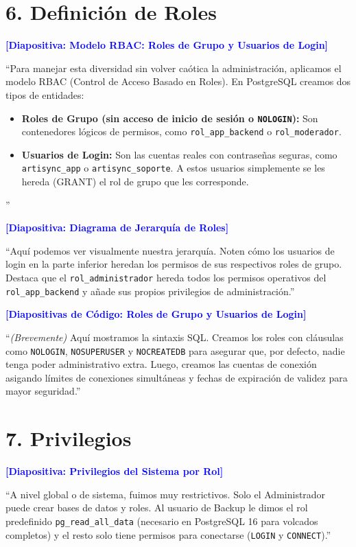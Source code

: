 \documentclass[12pt, a4paper]{article}
\begin{document}
\section*{6. Definición de Roles}
\textbf{\textcolor{blue}{[Diapositiva: Modelo RBAC: Roles de Grupo y Usuarios de Login]}}

``Para manejar esta diversidad sin volver caótica la administración, aplicamos el modelo RBAC (Control de Acceso Basado en Roles).
En PostgreSQL creamos dos tipos de entidades:
\begin{itemize}
    \item \textbf{Roles de Grupo (sin acceso de inicio de sesión o \texttt{NOLOGIN}):} Son contenedores lógicos de permisos, como \texttt{rol\_app\_backend} o \texttt{rol\_moderador}.
    \item \textbf{Usuarios de Login:} Son las cuentas reales con contraseñas seguras, como \texttt{artisync\_app} o \texttt{artisync\_soporte}. A estos usuarios simplemente se les hereda (GRANT) el rol de grupo que les corresponde.
\end{itemize}''

\vspace{0.5cm}
\textbf{\textcolor{blue}{[Diapositiva: Diagrama de Jerarquía de Roles]}}

``Aquí podemos ver visualmente nuestra jerarquía. Noten cómo los usuarios de login en la parte inferior heredan los permisos de sus respectivos roles de grupo. Destaca que el \texttt{rol\_administrador} hereda todos los permisos operativos del \texttt{rol\_app\_backend} y añade sus propios privilegios de administración.''

\vspace{0.5cm}
\textbf{\textcolor{blue}{[Diapositivas de Código: Roles de Grupo y Usuarios de Login]}}

``\textit{(Brevemente)} Aquí mostramos la sintaxis SQL. Creamos los roles con cláusulas como \texttt{NOLOGIN}, \texttt{NOSUPERUSER} y \texttt{NOCREATEDB} para asegurar que, por defecto, nadie tenga poder administrativo extra. Luego, creamos las cuentas de conexión asigando límites de conexiones simultáneas y fechas de expiración de validez para mayor seguridad.''

\section*{7. Privilegios}
\textbf{\textcolor{blue}{[Diapositiva: Privilegios del Sistema por Rol]}}

``A nivel global o de sistema, fuimos muy restrictivos. Solo el Administrador puede crear bases de datos y roles. Al usuario de Backup le dimos el rol predefinido \texttt{pg\_read\_all\_data} (necesario en PostgreSQL 16 para volcados completos) y el resto solo tiene permisos para conectarse (\texttt{LOGIN} y \texttt{CONNECT}).''
\end{document}
